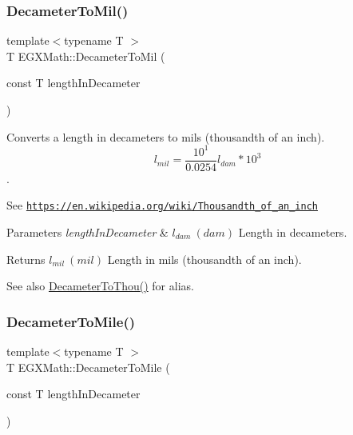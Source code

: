 \subsubsection{\texorpdfstring{Decameter\+To\+Mil()}{DecameterToMil()}}
{\footnotesize\ttfamily template$<$typename T $>$ \\
T E\+G\+X\+Math\+::\+Decameter\+To\+Mil (\begin{DoxyParamCaption}\item[{const T}]{length\+In\+Decameter }\end{DoxyParamCaption})}



Converts a length in decameters to mils (thousandth of an inch). \[ l_{mil}= \frac{10^{1}}{0.0254} l_{dam} * 10^{3} \]. 

See \href{https://en.wikipedia.org/wiki/Thousandth_of_an_inch}{\tt https\+://en.\+wikipedia.\+org/wiki/\+Thousandth\+\_\+of\+\_\+an\+\_\+inch} 
\begin{DoxyParams}{Parameters}
{\em length\+In\+Decameter} & $ l_{dam}\ (dam)$ Length in decameters. \\
\hline
\end{DoxyParams}
\begin{DoxyReturn}{Returns}
$ l_{mil}\ (mil)$ Length in mils (thousandth of an inch). 
\end{DoxyReturn}
\begin{DoxySeeAlso}{See also}
\mbox{\hyperlink{group___e_g_x_math-_conversions-_length_conversions-_s_i-_decameter-_imperial_ga4f21f4b1df62d1d63f46849c4f38d56b}{Decameter\+To\+Thou()}} for alias. 
\end{DoxySeeAlso}
\mbox{\label{group___e_g_x_math-_conversions-_length_conversions-_s_i-_decameter-_imperial_gac2a54223d869e01fc7a9c73fbf3f2906}} 
\subsubsection{\texorpdfstring{Decameter\+To\+Mile()}{DecameterToMile()}}
{\footnotesize\ttfamily template$<$typename T $>$ \\
T E\+G\+X\+Math\+::\+Decameter\+To\+Mile (\begin{DoxyParamCaption}\item[{const T}]{length\+In\+Decameter }\end{DoxyParamCaption})}



